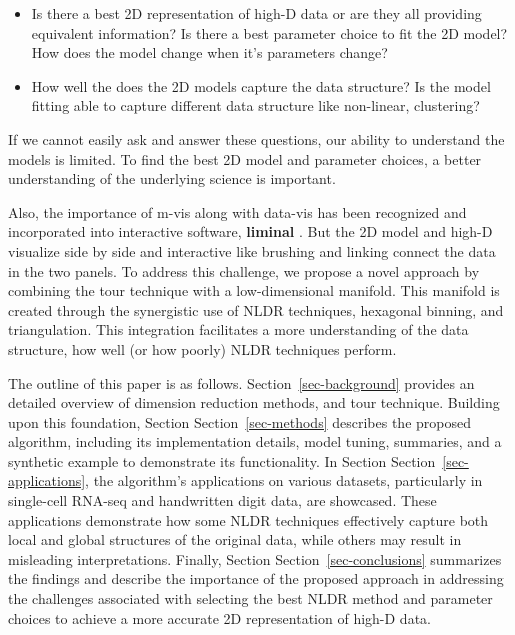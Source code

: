 \documentclass[
  12pt]{article}
\begin{document}
\begin{itemize}
\item
  Is there a best 2D representation of high-D data or are they all
  providing equivalent information? Is there a best parameter choice to
  fit the 2D model? How does the model change when it's parameters
  change?
\item
  How well the does the 2D models capture the data structure? Is the
  model fitting able to capture different data structure like
  non-linear, clustering?
\end{itemize}

If we cannot easily ask and answer these questions, our ability to
understand the models is limited. To find the best 2D model and
parameter choices, a better understanding of the underlying science is
important.

Also, the importance of m-vis along with data-vis has been recognized
and incorporated into interactive software, \textbf{liminal}
\citep{article21}. But the 2D model and high-D visualize side by side
and interactive like brushing and linking connect the data in the two
panels. To address this challenge, we propose a novel approach by
combining the tour technique with a low-dimensional manifold. This
manifold is created through the synergistic use of NLDR techniques,
hexagonal binning, and triangulation. This integration facilitates a
more understanding of the data structure, how well (or how poorly) NLDR
techniques perform.

The outline of this paper is as follows. Section~\ref{sec-background}
provides an detailed overview of dimension reduction methods, and tour
technique. Building upon this foundation, Section
Section~\ref{sec-methods} describes the proposed algorithm, including
its implementation details, model tuning, summaries, and a synthetic
example to demonstrate its functionality. In Section
Section~\ref{sec-applications}, the algorithm's applications on various
datasets, particularly in single-cell RNA-seq and handwritten digit
data, are showcased. These applications demonstrate how some NLDR
techniques effectively capture both local and global structures of the
original data, while others may result in misleading interpretations.
Finally, Section Section~\ref{sec-conclusions} summarizes the findings
and describe the importance of the proposed approach in addressing the
challenges associated with selecting the best NLDR method and parameter
choices to achieve a more accurate 2D representation of high-D data.
\end{document}
